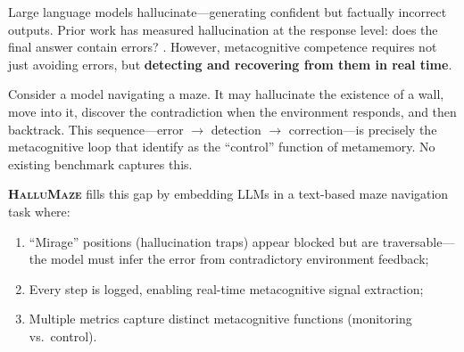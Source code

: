 \documentclass{article}
\begin{document}
Large language models hallucinate---generating confident but factually incorrect outputs.
Prior work has measured hallucination at the response level: does the final answer contain errors? \citep{lin2022truthfulqa, ji2023halueval}.
However, metacognitive competence requires not just avoiding errors, but \textbf{detecting and recovering from them in real time}.

Consider a model navigating a maze.
It may hallucinate the existence of a wall, move into it, discover the contradiction when the environment responds, and then backtrack.
This sequence---error $\to$ detection $\to$ correction---is precisely the metacognitive loop that \citet{nelson1990metamemory} identify as the ``control'' function of metamemory.
No existing benchmark captures this.

\textbf{\textsc{HalluMaze}} fills this gap by embedding LLMs in a text-based maze navigation task where:
\begin{enumerate}[nosep]
  \item ``Mirage'' positions (hallucination traps) appear blocked but are traversable---the model must infer the error from contradictory environment feedback;
  \item Every step is logged, enabling real-time metacognitive signal extraction;
  \item Multiple metrics capture distinct metacognitive functions (monitoring vs.\ control).
\end{enumerate}
\end{document}
